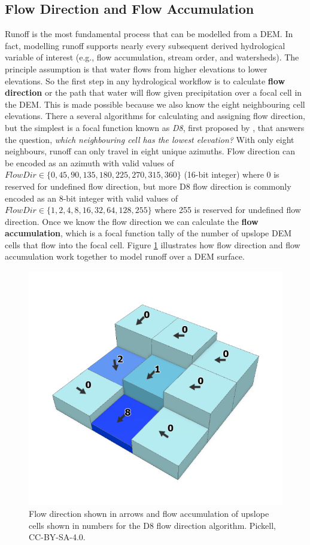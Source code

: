 \documentclass[
]{book}
\begin{document}
\subsection{Flow Direction and Flow Accumulation}\label{flow-direction-and-flow-accumulation}

Runoff is the most fundamental process that can be modelled from a DEM. In fact, modelling runoff supports nearly every subsequent derived hydrological variable of interest (e.g., flow accumulation, stream order, and watersheds). The principle assumption is that water flows from higher elevations to lower elevations. So the first step in any hydrological workflow is to calculate \textbf{flow direction} or the path that water will flow given precipitation over a focal cell in the DEM. This is made possible because we also know the eight neighbouring cell elevations. There a several algorithms for calculating and assigning flow direction, but the simplest is a focal function known as \emph{D8}, first proposed by \citet{greenlee_raster_1987}, that answers the question, \emph{which neighbouring cell has the lowest elevation?} With only eight neighbours, runoff can only travel in eight unique azimuths. Flow direction can be encoded as an azimuth with valid values of \(FlowDir∈\{0,45,90,135,180,225,270,315,360\}\) (16-bit integer) where 0 is reserved for undefined flow direction, but more D8 flow direction is commonly encoded as an 8-bit integer with valid values of \(FlowDir∈\{1,2,4,8,16,32,64,128,255\}\) where 255 is reserved for undefined flow direction. Once we know the flow direction we can calculate the \textbf{flow accumulation}, which is a focal function tally of the number of upslope DEM cells that flow into the focal cell. Figure \ref{fig:9-flow-direction-accumulation} illustrates how flow direction and flow accumulation work together to model runoff over a DEM surface.

\begin{figure}
\includegraphics[width=0.75\linewidth]{images/09-flow-direction-accumulation} \caption{Flow direction shown in arrows and flow accumulation of upslope cells shown in numbers for the D8 flow direction algorithm. Pickell, CC-BY-SA-4.0.}\label{fig:9-flow-direction-accumulation}
\end{figure}
\end{document}

